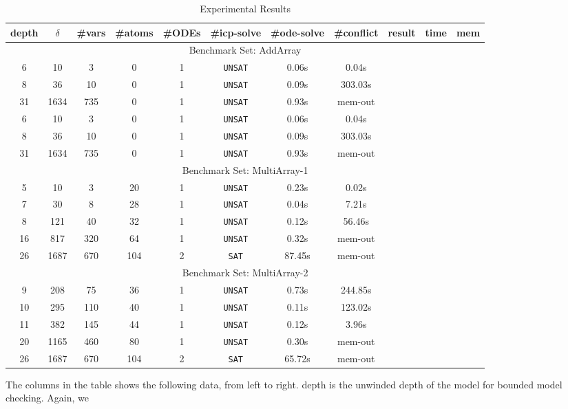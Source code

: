 \documentclass[envcountsect]{llncs}
\begin{document}
\vspace{-0.7cm}
\begin{center}
\begin{table}[h]
\centering
\begin{tabular}{||c|c|| c| c| c||c|c|c||c|c|c||}
\hline
depth & $\delta$ & \#vars  &\#atoms &\#ODEs &\#icp-solve &
\#ode-solve& \#conflict & result & time & mem \\
\hline
\multicolumn{11}{|c|}{Benchmark Set: AddArray} \\
\hline
 6 & 10 & 3 & 0  & 1& {\tt UNSAT}& 0.06s &0.04s\\
 8 & 36 & 10 & 0 & 1 &{\tt UNSAT}& 0.09s &303.03s \\
 31 & 1634 & 735 & 0 & 1& {\tt UNSAT}& 0.93s & mem-out \\
 6 & 10 & 3 & 0  & 1& {\tt UNSAT}& 0.06s &0.04s\\
 8 & 36 & 10 & 0 & 1 &{\tt UNSAT}& 0.09s &303.03s \\
 31 & 1634 & 735 & 0 & 1& {\tt UNSAT}& 0.93s & mem-out \\
\hline
\multicolumn{11}{|c|}{Benchmark Set: MultiArray-1} \\
\hline
 5 & 10 & 3 & 20 & 1&{\tt UNSAT}& 0.23s  & 0.02s   \\
 7 & 30 & 8 & 28 & 1 &{\tt UNSAT}& 0.04s & 7.21s   \\
 8 & 121 & 40 & 32 &1 &{\tt UNSAT}& 0.12s & 56.46s   \\
 16 & 817 & 320 & 64 & 1 &{\tt UNSAT}& 0.32s  & mem-out\\
26 & 1687 & 670 & 104 & 2 &{\tt SAT} & 87.45s & mem-out\\
\hline
\multicolumn{11}{|c|}{Benchmark Set: MultiArray-2} \\
\hline
 9 & 208 & 75 & 36 & 1 &{\tt UNSAT}& 0.73s & 244.85s \\
 10 & 295 & 110 & 40 & 1 &{\tt UNSAT}& 0.11s & 123.02s \\
 11 & 382 & 145 & 44 & 1 &{\tt UNSAT}& 0.12s & 3.96s \\
 20 & 1165 & 460 & 80 & 1 &{\tt UNSAT}& 0.30s & mem-out  \\
26 & 1687 & 670 & 104 & 2 &{\tt SAT} & 65.72s & mem-out \\
\hline
\end{tabular}
\caption{Experimental Results}
\end{table}
\end{center}
\vspace{-1.5cm}
The columns in the table shows the following data, from left to right. {\sf
depth} is the unwinded depth of the model for bounded model checking. Again, we
\end{document}
